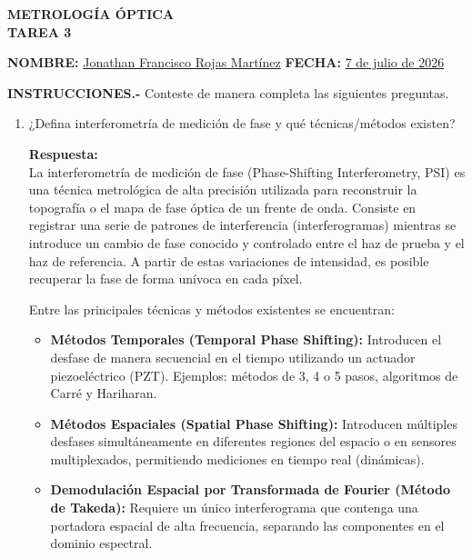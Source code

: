 \documentclass[12pt,letterpaper]{article}
\begin{document}
	
	\begin{center}
		\Large \textbf{METROLOGÍA ÓPTICA} \\
		\vspace{0.3cm}
		\large \textbf{TAREA 3}
	\end{center}
	
	\vspace{0.5cm}
	\noindent \textbf{NOMBRE:} \underline{Jonathan Francisco Rojas Martínez} \hfill \textbf{FECHA:} \underline{7 de julio de 2026}
	
	\vspace{0.5cm}
	\noindent \textbf{INSTRUCCIONES.-} Conteste de manera completa las siguientes preguntas.
	\vspace{0.5cm}
	
	\begin{enumerate}
		\item[1.-] ¿Defina interferometría de medición de fase y qué técnicas/métodos existen?
		
		\vspace{0.3cm}
		\textbf{Respuesta:} \\
		La interferometría de medición de fase (Phase-Shifting Interferometry, PSI) es una técnica metrológica de alta precisión utilizada para reconstruir la topografía o el mapa de fase óptica de un frente de onda. Consiste en registrar una serie de patrones de interferencia (interferogramas) mientras se introduce un cambio de fase conocido y controlado entre el haz de prueba y el haz de referencia. A partir de estas variaciones de intensidad, es posible recuperar la fase de forma unívoca en cada píxel.
		
		Entre las principales técnicas y métodos existentes se encuentran:
		\begin{itemize}
			\item \textbf{Métodos Temporales (Temporal Phase Shifting):} Introducen el desfase de manera secuencial en el tiempo utilizando un actuador piezoeléctrico (PZT). Ejemplos: métodos de 3, 4 o 5 pasos, algoritmos de Carré y Hariharan.
			\item \textbf{Métodos Espaciales (Spatial Phase Shifting):} Introducen múltiples desfases simultáneamente en diferentes regiones del espacio o en sensores multiplexados, permitiendo mediciones en tiempo real (dinámicas).
			\item \textbf{Demodulación Espacial por Transformada de Fourier (Método de Takeda):} Requiere un único interferograma que contenga una portadora espacial de alta frecuencia, separando las componentes en el dominio espectral.
		\end{itemize}
		\vspace{0.5cm}
		

\end{enumerate}
\end{document}
